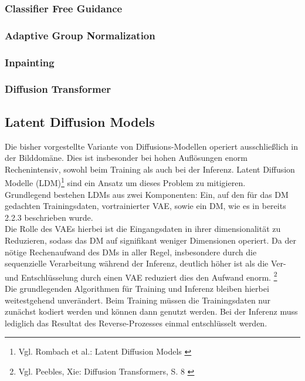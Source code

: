 \subsubsection{Classifier Free Guidance}

\subsubsection{Adaptive Group Normalization}

\subsubsection{Inpainting}


\subsubsection{Diffusion Transformer}


\subsection{Latent Diffusion Models}

Die bisher vorgestellte Variante von Diffusions-Modellen operiert ausschließlich in der Bilddomäne. Dies ist insbesonder bei hohen Auflösungen enorm Rechenintensiv, sowohl beim Training als auch bei der Inferenz. Latent Diffusion Modelle (LDM)\footnote{
    Vgl. Rombach et al.: Latent Diffusion Models
    \cite{rombach2022high}
}  sind ein Ansatz um dieses Problem zu mitigieren. \\
Grundlegend bestehen LDMs aus zwei Komponenten: Ein, auf den für das DM gedachten Trainingsdaten, vortrainierter VAE, sowie ein DM, wie es in bereits 2.2.3 beschrieben wurde. \\
Die Rolle des VAEs hierbei ist die Eingangsdaten in ihrer dimensionalität zu Reduzieren, sodass das DM auf signifikant weniger Dimensionen operiert. Da der nötige Rechenaufwand des DMs in aller Regel, insbesondere durch die sequenzielle Verarbeitung während der Inferenz, deutlich höher ist als die Ver- und Entschlüsselung durch einen VAE reduziert dies den Aufwand enorm.  \footnote{
    Vgl. Peebles, Xie: Diffusion Transformers, S. 8
    \cite{peebles2023scalable}
} \\
Die grundlegenden Algorithmen für Training und Inferenz bleiben hierbei weitestgehend unverändert. Beim Training müssen die Trainingsdaten nur zunächst kodiert werden und können dann genutzt werden. Bei der Inferenz muss lediglich das Resultat des Reverse-Prozesses einmal entschlüsselt werden.

